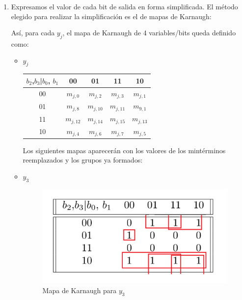 \documentclass[../../informe/src/main.tex]{subfiles}
\begin{document}
\begin{enumerate}
 \item Expresamos el valor de cada bit de salida en forma simplificada. El método elegido para realizar la simplificación es el de mapas de Karnaugh: \par
 
Así, para cada $y_{j}$, el mapa de Karnaugh de 4 variables/bits queda definido como: 
\begin{itemize} 

\item $y_{j}$
 \begin{table}[H] %
\centering
 \begin{tabular}{||c c c c c||} 
 \hline
$b_{2}$,$b_{3}$|$b_{0}$, $b_{1}$ & 00 & 01 & 11 & 10\\ [0.5ex] 
 \hline\hline
00 & $m_{j,0}$ & $m_{j,2}$ & $m_{j,3}$ & $m_{j,1}$\\
01 & $m_{j,8}$ & $m_{j,10}$ & $m_{j,11}$ & $m_{9,1}$\\
11 & $m_{j,12}$ & $m_{j,14}$ & $m_{j,15}$ & $m_{j,13}$\\
10 & $m_{j,4}$ & $m_{j,6}$ & $m_{j,7}$ & $m_{j,5}$\\[1ex] 
\hline
\end{tabular}
\end{table}
Los siguientes mapas aparecerán con los valores de los mintérminos reemplazados y los grupos ya formados:
\item $y_3$ 				%

\begin{figure}[H]	%
	\centering
	\includegraphics[scale=0.5]{imagenes/karnaugh_mapa_y3.png}
	\caption{Mapa de Karnaugh para $y_3$}
	\label{fig:ej4_karnaugh_mapa_y3}
\end{figure}


\end{itemize}
\end{enumerate}
\end{document}
